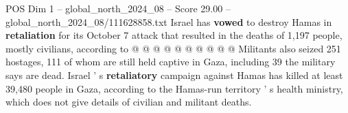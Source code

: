 \begin{textsample}{POS Dim 1 – global\_north\_2024\_08 – Score 29.00 – global\_north\_2024\_08/111628858.txt}
Israel has \textbf{vowed} to destroy Hamas in \textbf{retaliation} for its October 7 attack that resulted in the deaths of 1,197 people, mostly civilians, according to @ @ @ @ @ @ @ @ @ @ Militants also seized 251 hostages, 111 of whom are still held captive in Gaza, including 39 the military says are dead.
Israel ' s \textbf{retaliatory} campaign against Hamas has killed at least 39,480 people in Gaza, according to the Hamas-run territory ' s health ministry, which does not give details of civilian and militant deaths.

\end{textsample}
